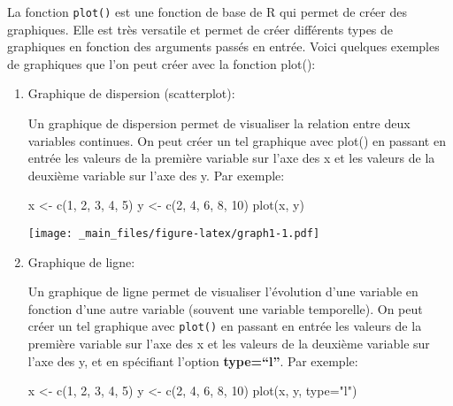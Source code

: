 \documentclass[
]{article}
\newenvironment{Shaded}{\begin{snugshade}}{\end{snugshade}}
\newcommand{\AttributeTok}[1]{\textcolor[rgb]{0.77,0.63,0.00}{#1}}
\newcommand{\DecValTok}[1]{\textcolor[rgb]{0.00,0.00,0.81}{#1}}
\newcommand{\FunctionTok}[1]{\textcolor[rgb]{0.00,0.00,0.00}{#1}}
\newcommand{\NormalTok}[1]{#1}
\newcommand{\OtherTok}[1]{\textcolor[rgb]{0.56,0.35,0.01}{#1}}
\newcommand{\StringTok}[1]{\textcolor[rgb]{0.31,0.60,0.02}{#1}}
\begin{document}
La fonction \texttt{plot()} est une fonction de base de R qui permet de créer des graphiques. Elle est très versatile et permet de créer différents types de graphiques en fonction des arguments passés en entrée. Voici quelques exemples de graphiques que l'on peut créer avec la fonction plot():

\begin{enumerate}
\def\labelenumi{\arabic{enumi}.}
\item
  Graphique de dispersion (scatterplot):

  Un graphique de dispersion permet de visualiser la relation entre deux variables continues. On peut créer un tel graphique avec plot() en passant en entrée les valeurs de la première variable sur l'axe des x et les valeurs de la deuxième variable sur l'axe des y. Par exemple:

\begin{Shaded}
\begin{Highlighting}[]
\NormalTok{x }\OtherTok{\textless{}{-}} \FunctionTok{c}\NormalTok{(}\DecValTok{1}\NormalTok{, }\DecValTok{2}\NormalTok{, }\DecValTok{3}\NormalTok{, }\DecValTok{4}\NormalTok{, }\DecValTok{5}\NormalTok{)}
\NormalTok{y }\OtherTok{\textless{}{-}} \FunctionTok{c}\NormalTok{(}\DecValTok{2}\NormalTok{, }\DecValTok{4}\NormalTok{, }\DecValTok{6}\NormalTok{, }\DecValTok{8}\NormalTok{, }\DecValTok{10}\NormalTok{)}
\FunctionTok{plot}\NormalTok{(x, y)}
\end{Highlighting}
\end{Shaded}

  \texttt{[image: \_main\_files/figure-latex/graph1-1.pdf]}
\item
  Graphique de ligne:

  Un graphique de ligne permet de visualiser l'évolution d'une variable en fonction d'une autre variable (souvent une variable temporelle). On peut créer un tel graphique avec \texttt{plot()} en passant en entrée les valeurs de la première variable sur l'axe des x et les valeurs de la deuxième variable sur l'axe des y, et en spécifiant l'option \textbf{type=``l''}. Par exemple:

\begin{Shaded}
\begin{Highlighting}[]
\NormalTok{x }\OtherTok{\textless{}{-}} \FunctionTok{c}\NormalTok{(}\DecValTok{1}\NormalTok{, }\DecValTok{2}\NormalTok{, }\DecValTok{3}\NormalTok{, }\DecValTok{4}\NormalTok{, }\DecValTok{5}\NormalTok{)}
\NormalTok{y }\OtherTok{\textless{}{-}} \FunctionTok{c}\NormalTok{(}\DecValTok{2}\NormalTok{, }\DecValTok{4}\NormalTok{, }\DecValTok{6}\NormalTok{, }\DecValTok{8}\NormalTok{, }\DecValTok{10}\NormalTok{)}
\FunctionTok{plot}\NormalTok{(x, y, }\AttributeTok{type=}\StringTok{"l"}\NormalTok{)}
\end{Highlighting}
\end{Shaded}


\end{enumerate}
\end{document}
